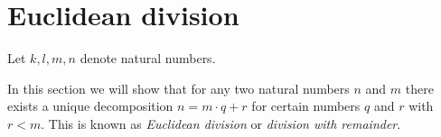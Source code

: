 \documentclass[../../arithmetic.ftl.tex]{subfiles}
\begin{document}
  \section{Euclidean division}

  \begin{forthel}
  \end{forthel}

  \begin{forthel}
    Let $k, l, m, n$ denote natural numbers.
  \end{forthel}

  In this section we will show that for any two natural numbers $n$ and $m$
  there exists a unique decomposition $n = m \cdot q + r$ for certain numbers
  $q$ and $r$ with $r < m$. This is known as \textit{Euclidean division} or
  \textit{division with remainder}.
\end{document}
